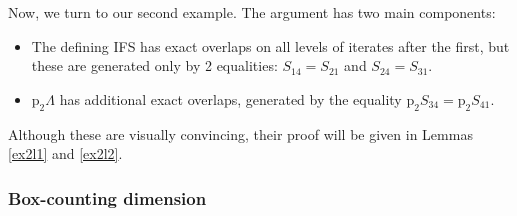 \documentclass[a4paper, 11pt]{article}
\numberwithin{equation}{section}
\theoremstyle{plain}
\theoremstyle{remark}
\theoremstyle{definition}
\begin{document}
Now, we turn to our second example. The argument has two main components:
\begin{itemize}
\item The defining IFS has exact overlaps on all levels of iterates after the first, but these are generated only by 2 equalities: $S_{14} = S_{21}$ and $S_{24} = S_{31}$.
\item $\mathrm{p}_2\Lambda$ has additional exact overlaps, generated by the equality $\mathrm{p}_2 S_{34} = \mathrm{p}_2 S_{41}$.
\end{itemize}
Although these are visually convincing, their proof will be given in Lemmas \ref{ex2l1} and \ref{ex2l2}.

\subsubsection{Box-counting dimension}
\end{document}
